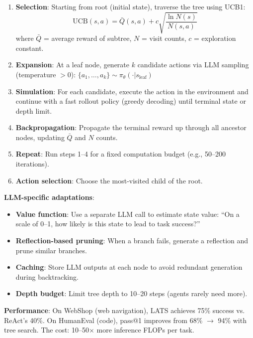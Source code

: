\begin{enumerate}
  \item \textbf{Selection}: Starting from root (initial state), traverse the tree using UCB1: 
\begin{equation}
\text{UCB}(s, a) = \bar{Q}(s, a) + c \sqrt{\frac{\ln N(s)}{N(s, a)}}
\end{equation}
 where $\bar{Q}$ = average reward of subtree, $N$ = visit counts, $c$ = exploration constant.
  \item \textbf{Expansion}: At a leaf node, generate $k$ candidate actions via LLM sampling (temperature $> 0$): $\{a_1, \ldots, a_k\} \sim \pi_\theta(\cdot | s_{\text{leaf}})$
  \item \textbf{Simulation}: For each candidate, execute the action in the environment and continue with a fast rollout policy (greedy decoding) until terminal state or depth limit.
  \item \textbf{Backpropagation}: Propagate the terminal reward up through all ancestor nodes, updating $\bar{Q}$ and $N$ counts.
  \item \textbf{Repeat}: Run steps 1--4 for a fixed computation budget (e.g., 50--200 iterations).
  \item \textbf{Action selection}: Choose the most-visited child of the root.
\end{enumerate}

\textbf{LLM-specific adaptations}:

\begin{itemize}
  \item \textbf{Value function}: Use a separate LLM call to estimate state value: ``On a scale of 0--1, how likely is this state to lead to task success?''
  \item \textbf{Reflection-based pruning}: When a branch fails, generate a reflection and prune similar branches.
  \item \textbf{Caching}: Store LLM outputs at each node to avoid redundant generation during backtracking.
  \item \textbf{Depth budget}: Limit tree depth to 10--20 steps (agents rarely need more).
\end{itemize}

\textbf{Performance}: On WebShop (web navigation), LATS achieves 75\% success vs. ReAct’s 40\%. On HumanEval (code), pass@1 improves from 68\% $\rightarrow$ 94\% with tree search. The cost: 10--50$\times$ more inference FLOPs per task.

